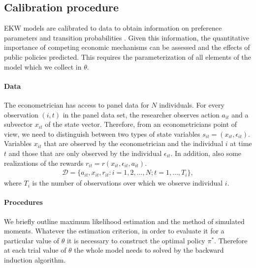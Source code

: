 \subsection{Calibration procedure}\label{Estimation}
EKW models are calibrated to data to obtain information on preference parameters and transition probabilities \citep{Davidson.2003,Gourieroux.1996}. Given this information, the quantitative importance of competing economic mechanisms can be assessed and the effects of public policies predicted. This requires the parameterization of all elements of the model which we collect in $\theta$.

\paragraph{Data} The econometrician has access to panel data for $N$ individuals. For every observation $(i, t)$ in the panel data set, the researcher observes action $a_{it}$ and a subvector $x_{it}$ of the state vector. Therefore, from an econometricians point of view, we need to distinguish between two types of state variables $s_{it} = (x_{it}, \epsilon_{it})$. Variables $x_{it}$ that are observed by the econometrician and the individual $i$ at time $t$ and those that are only observed by the individual $\epsilon_{it}$.  In addition, also some realizations of the rewards $r_{it} = r(x_{it}, \epsilon_{it}, a_{it})$.
%
\begin{align*}
  \mathcal{D} = \{a_{it}, x_{it}, r_{it}: i = 1,2, \hdots, N; t = 1, \hdots, T_i\},
\end{align*}
where $T_i$ is the number of observations over which we observe individual $i$.

\paragraph{Procedures} We briefly outline maximum likelihood estimation and the method of simulated moments.  Whatever the estimation criterion, in order to evaluate it for a particular value of $\theta$  it is necessary to construct the optimal policy $\pi^*$. Therefore at each trial value of $\theta$ the whole model needs to solved by the backward induction algorithm.

